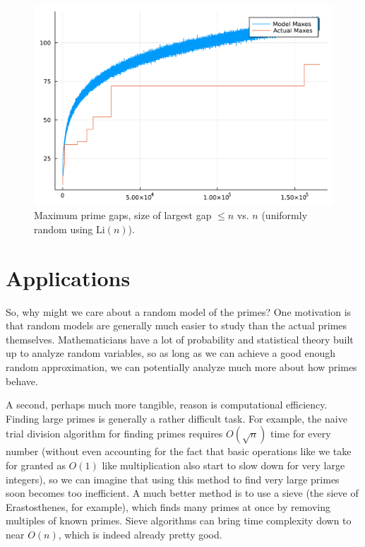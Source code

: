 \documentclass[conference]{IEEEtran}
\begin{document}
\begin{figure}[H]
  \centering
  \includegraphics[width=\linewidth,keepaspectratio]{random_model_li.pdf}
  \caption{Maximum prime gaps, size of largest gap $\le n$ vs. $n$ (uniformly random using $\mathrm{Li}(n)$).}
\end{figure}

\section{Applications}
So, why might we care about a random model of the primes?
One motivation is that random models are generally much
easier to study than the actual primes themselves.
Mathematicians have a lot of probability and statistical
theory built up to analyze random variables, so as long
as we can achieve a good enough random approximation, we
can potentially analyze much more about how primes behave.

A second, perhaps much more tangible, reason is
computational efficiency. Finding large primes is
generally a rather difficult task. For example, the naive
trial division algorithm for finding primes requires
$O(\sqrt{n})$ time for every number (without even
accounting for the fact that basic operations like
we take for granted as $O(1)$ like multiplication also
start to slow down for very large integers),
so we can imagine that
using this method to find very large primes soon becomes
too inefficient. A much better method is to
use a sieve (the sieve of Erastosthenes, for example),
which finds many primes at once by removing multiples of
known primes. Sieve algorithms can bring time complexity
down to near $O(n)$, which is indeed already pretty good. 
\end{document}
